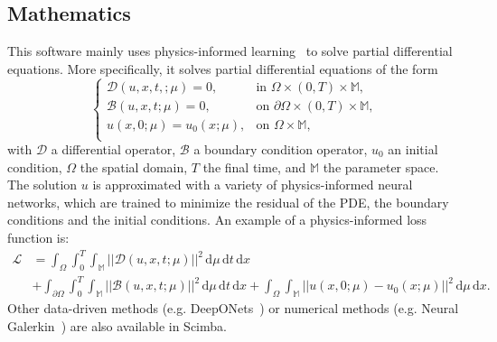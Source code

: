 \subsection{Mathematics}
\label{sec:Scimba:mathematics}


This software mainly uses physics-informed
learning~\cite{karniadakis_physics-informed_2021}
to solve partial differential equations.
More specifically, it solves partial differential equations of the form
\begin{equation*}
    \begin{cases}
        \mathcal{D}(u, x, t,; \mu) = 0,
         & \text{in } \Omega \times (0,T) \times \mathbb{M},          \\
        \mathcal{B}(u, x, t; \mu) = 0,
         & \text{on } \partial \Omega \times (0,T) \times \mathbb{M}, \\
        u(x, 0; \mu) = u_0(x; \mu),
         & \text{on } \Omega \times \mathbb{M},                       \\
    \end{cases}
\end{equation*}
with $\mathcal{D}$ a differential operator, $\mathcal{B}$ a boundary condition operator,
$u_0$ an initial condition, $\Omega$ the spatial domain,
$T$ the final time, and $\mathbb{M}$ the parameter space.
The solution $u$ is approximated with a variety of physics-informed neural networks,
which are trained to minimize the residual of the PDE,
the boundary conditions and the initial conditions.
An example of a physics-informed loss function is:
\begin{equation*}
    \begin{aligned}
        \mathcal{L} & =
        \int_\Omega \int_0^T \int_{\mathbb{M}}
        ||\mathcal{D}(u, x, t; \mu)||^2 \,
        \mathrm{d}\mu \, \mathrm{d}t \, \mathrm{d}x \\
                    & +
        \int_{\partial\Omega} \int_0^T \int_{\mathbb{M}}
        ||\mathcal{B}(u, x, t; \mu)||^2 \,
        \mathrm{d}\mu \, \mathrm{d}t \, \mathrm{d}x
        +
        \int_{\Omega} \int_{\mathbb{M}}
        ||u(x, 0; \mu) - u_0(x;\mu)||^2 \,
        \mathrm{d}\mu \, \mathrm{d}x.
    \end{aligned}
\end{equation*}
Other data-driven methods
(e.g. DeepONets~\cite{lu_learning_2021})
or numerical methods
(e.g. Neural Galerkin~\cite{bruna_neural_2024})
are also available in Scimba.

